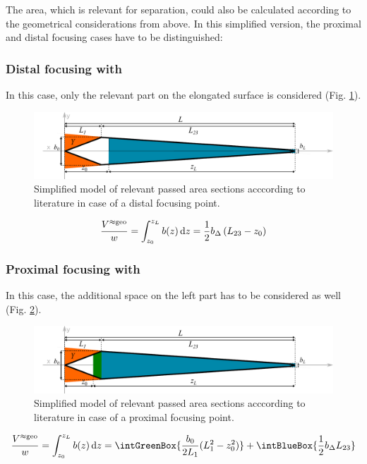 The area, which is relevant for separation, could also be calculated according to the geometrical considerations from 
above.
In this simplified version, the proximal and distal focusing cases have to be distinguished:
\subsubsection*{Distal focusing with }
In this case, only the relevant part on the elongated surface is considered (Fig. \ref{fig:fffApprox1}).
\begin{figure}[h]
  \begin{center}
    \includegraphics[width=\linewidth]{./images/fffApprox1.pdf}
    \vspace*{-3ex}    
  \end{center}
  \caption[Passed area section - distal focussing, simplified approximation]{
   Simplified model of relevant passed area sections acccording to literature  in case of a distal 
   focusing 
   point. }
  \label{fig:fffApprox1} 
\end{figure}
\begin{equation}
\frac{V^{\approx\text{geo}}}{w} = 
 \int_{z_0}^{z_L} b(z) \mathop{}\!\mathrm{d} z = 
\frac{1}{2}
b_\Delta
\left( L_{23} - z_0 \right) 
\end{equation}
\FloatBarrier
\subsubsection*{Proximal focusing with }
In this case, the additional space on the left part has to be considered as well (Fig. \ref{fig:fffApprox2}).
\begin{figure}[H]
  \begin{center}
    \includegraphics[width=\linewidth]{./images/fffApprox2.pdf}
    \vspace*{-3ex}    
  \end{center}
  \caption[Passed area section - distal focussing, simplified approximation]{
    Simplified model of relevant passed area sections acccording to literature 
   in case of a proximal focusing 
    point.}
  \label{fig:fffApprox2}
\end{figure}

\begin{equation}
\frac{\Vappgeo}{w} = 
 \int_{z_0}^{\zL} b(z) \diff z = 
\intGreenBox{ \ensuremath {\frac{b_0}{2 L_1}  (L_1^2-z_0^2) }}
+ \intBlueBox{ \ensuremath { \frac{1}{2} 
    \bDelta
      L_{23} } }
\end{equation}

